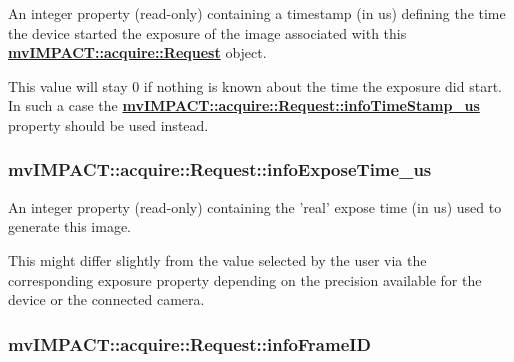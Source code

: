 An integer property {\bfseries }(read-\/only) containing a timestamp (in us) defining the time the device started the exposure of the image associated with this {\bfseries \hyperlink{classmv_i_m_p_a_c_t_1_1acquire_1_1_request}{mv\+I\+M\+P\+A\+C\+T\+::acquire\+::\+Request}} object. 

This value will stay 0 if nothing is known about the time the exposure did start. In such a case the {\bfseries \hyperlink{classmv_i_m_p_a_c_t_1_1acquire_1_1_request_ac26005e19f53dc564e3c3763a1fccaee}{mv\+I\+M\+P\+A\+C\+T\+::acquire\+::\+Request\+::info\+Time\+Stamp\+\_\+us}} property should be used instead. \hypertarget{classmv_i_m_p_a_c_t_1_1acquire_1_1_request_a872084ae4d05e6276afb06a314d8af59}{
\subsubsection[{info\+Expose\+Time\+\_\+us}]{ mv\+I\+M\+P\+A\+C\+T\+::acquire\+::\+Request\+::info\+Expose\+Time\+\_\+us}}\label{classmv_i_m_p_a_c_t_1_1acquire_1_1_request_a872084ae4d05e6276afb06a314d8af59}


An integer property {\bfseries }(read-\/only) containing the 'real' expose time (in us) used to generate this image. 

This might differ slightly from the value selected by the user via the corresponding exposure property depending on the precision available for the device or the connected camera. \hypertarget{classmv_i_m_p_a_c_t_1_1acquire_1_1_request_a08460d237bdcedcbfbca11aa528969e6}{
\subsubsection[{info\+Frame\+I\+D}]{ mv\+I\+M\+P\+A\+C\+T\+::acquire\+::\+Request\+::info\+Frame\+I\+D}}\label{classmv_i_m_p_a_c_t_1_1acquire_1_1_request_a08460d237bdcedcbfbca11aa528969e6}


